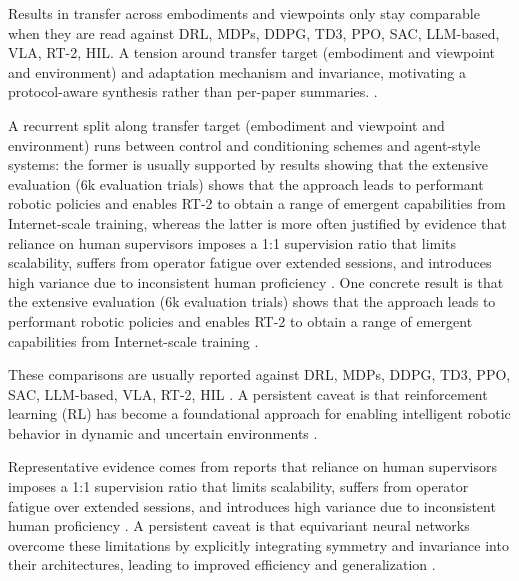 \documentclass[a4paper,11pt]{article}
\begin{document}
Results in transfer across embodiments and viewpoints only stay comparable when they are read against DRL, MDPs, DDPG, TD3, PPO, SAC, LLM-based, VLA, RT-2, HIL. A tension around transfer target (embodiment and viewpoint and environment) and adaptation mechanism and invariance, motivating a protocol-aware synthesis rather than per-paper summaries. \citep{Cheang2025Technical,Chen2025Internvla,Chen2025Survey,Da2025Survey}.

A recurrent split along transfer target (embodiment and viewpoint and environment) runs between control and conditioning schemes and agent-style systems: the former is usually supported by results showing that the extensive evaluation (6k evaluation trials) shows that the approach leads to performant robotic policies and enables RT-2 to obtain a range of emergent capabilities from Internet-scale training, whereas the latter is more often justified by evidence that reliance on human supervisors imposes a 1:1 supervision ratio that limits scalability, suffers from operator fatigue over extended sessions, and introduces high variance due to inconsistent human proficiency \citep{Brohan2023Vision,Chen2026Accelerating}. One concrete result is that the extensive evaluation (6k evaluation trials) shows that the approach leads to performant robotic policies and enables RT-2 to obtain a range of emergent capabilities from Internet-scale training \citep{Brohan2023Vision}.

These comparisons are usually reported against DRL, MDPs, DDPG, TD3, PPO, SAC, LLM-based, VLA, RT-2, HIL \citep{Ter2025Taxonomy,Seo2025Equivariant,Brohan2023Vision,Chen2026Accelerating}. A persistent caveat is that reinforcement learning (RL) has become a foundational approach for enabling intelligent robotic behavior in dynamic and uncertain environments \citep{Ter2025Taxonomy}.

Representative evidence comes from reports that reliance on human supervisors imposes a 1:1 supervision ratio that limits scalability, suffers from operator fatigue over extended sessions, and introduces high variance due to inconsistent human proficiency \citep{Chen2026Accelerating}. A persistent caveat is that equivariant neural networks overcome these limitations by explicitly integrating symmetry and invariance into their architectures, leading to improved efficiency and generalization \citep{Seo2025Equivariant}.
\end{document}
